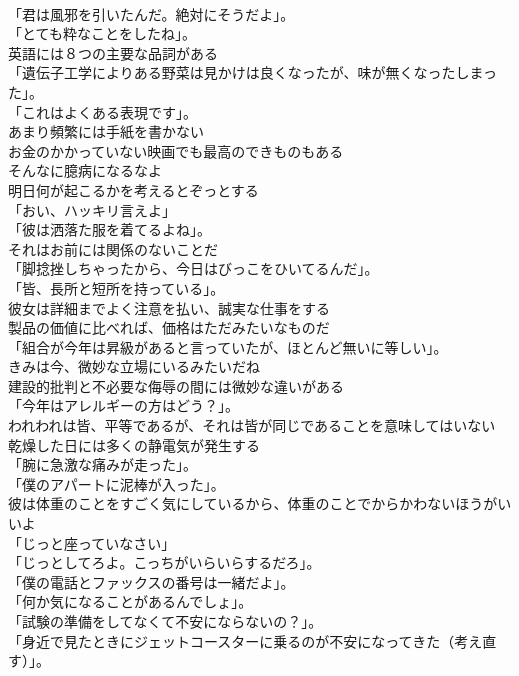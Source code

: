 \documentclass[8pt]{extreport}
\begin{document}
\begin{CJK}{UTF8}{min}
\\	「君は風邪を引いたんだ。絶対にそうだよ」。	
\\	「とても粋なことをしたね」。	
\\	英語には８つの主要な品詞がある	
\\	「遺伝子工学によりある野菜は見かけは良くなったが、味が無くなったしまった」。	
\\	「これはよくある表現です」。	
\\	あまり頻繁には手紙を書かない	
\\	お金のかかっていない映画でも最高のできものもある	
\\	そんなに臆病になるなよ	
\\	明日何が起こるかを考えるとぞっとする	
\\	「おい、ハッキリ言えよ」	
\\	「彼は洒落た服を着てるよね」。	
\\	それはお前には関係のないことだ	
\\	「脚捻挫しちゃったから、今日はびっこをひいてるんだ」。	
\\	「皆、長所と短所を持っている」。	
\\	彼女は詳細までよく注意を払い、誠実な仕事をする	
\\	製品の価値に比べれば、価格はただみたいなものだ	
\\	「組合が今年は昇級があると言っていたが、ほとんど無いに等しい」。	
\\	きみは今、微妙な立場にいるみたいだね	
\\	建設的批判と不必要な侮辱の間には微妙な違いがある	
\\	「今年はアレルギーの方はどう？」。	
\\	われわれは皆、平等であるが、それは皆が同じであることを意味してはいない	
\\	乾燥した日には多くの静電気が発生する	
\\	「腕に急激な痛みが走った」。	
\\	「僕のアパートに泥棒が入った」。	
\\	彼は体重のことをすごく気にしているから、体重のことでからかわないほうがいいよ	
\\	「じっと座っていなさい」	
\\	「じっとしてろよ。こっちがいらいらするだろ」。	
\\	「僕の電話とファックスの番号は一緒だよ」。	
\\	「何か気になることがあるんでしょ」。	
\\	「試験の準備をしてなくて不安にならないの？」。	
\\	「身近で見たときにジェットコースターに乗るのが不安になってきた（考え直す）」。	

\end{CJK}
\end{document}
